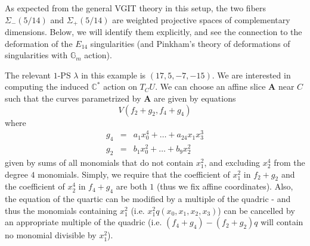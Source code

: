 \documentclass[11pt]{amsart}
\numberwithin{equation}{section}
\theoremstyle{plain}
\theoremstyle{remark}
\theoremstyle{definition}
\newcommand{\bC}{\mathbb{C}}
\begin{document}
  As expected from the general VGIT theory in this setup, the two fibers $\Sigma_{-}(5/14)$  and $\Sigma_{+}(5/14)$ are weighted projective spaces of complementary dimensions. Below, we will identify them explicitly, and see the connection to the deformation of the $E_{14}$ singularities (and Pinkham's theory of deformations of singularities with $\mathbb G_m$ action).
  
  
  The relevant $1$-PS $\lambda$ in this example is $(17,5,-7,-15)$. We are interested in computing the induced $\bC^*$ action on $T_{C}U$. We can choose an affine slice $\mathbf A$ near $C$
 such that the curves parametrized by $\mathbf A$ are given by equations
 $$V(f_2+g_2,f_4+g_4)$$
 where
  \begin{eqnarray*}
  g_4&=&a_1x_0^4+\dots+a_{24}x_1x_3^3\\
  g_2&=&b_1x_0^2+\dots+b_9x_2^2
  \end{eqnarray*}
 given by sums of all  monomials that do not contain $x_1^2$, and excluding $x_2^4$ from the degree $4$ monomials. Simply, we require that the coefficient of $x_1^2$ in $f_2+g_2$ and the coefficient of $x_2^4$ in $f_4+g_4$ are both $1$ (thus we fix affine coordinates). Also, the equation of the quartic can be modified by a multiple of the quadric - and thus the monomials containing $x_1^2$ (i.e. $x_1^2 q(x_0,x_1,x_2,x_3)$) can be cancelled by an appropriate multiple of the quadric (i.e. $(f_4+g_4)-(f_2+g_2)q$ will contain no monomial divisible by $x_1^2$). 
 
\end{document}
